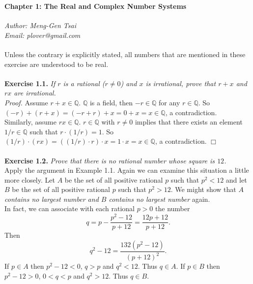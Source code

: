 \documentclass{article}
\begin{document}
\textbf{\Large Chapter 1: The Real and Complex Number Systems} \\\\



\emph{Author: Meng-Gen Tsai} \\
\emph{Email: plover@gmail.com} \\\\



Unless the contrary is explicitly stated, all numbers that are mentioned in these exercise
are understood to be real. \\\\



\textbf{Exercise 1.1.}
\emph{If $r$ is a rational ($r \neq 0$) and $x$ is irrational,
prove that $r + x$ and $rx$ are irrational.} \\

\emph{Proof.}
Assume $r + x \in \mathbb{Q}$.
$\mathbb{Q}$ is a field, then $-r \in \mathbb{Q}$ for any $r \in \mathbb{Q}$.
So $(-r) + (r + x) = (-r + r) + x = 0 + x = x \in \mathbb{Q}$, a contradiction. \\

Similarly, assume $rx \in \mathbb{Q}$. $r \in \mathbb{Q}$ with $r \neq 0$ implies that
there exists an element $1/r \in \mathbb{Q}$ such that $r \cdot (1/r) = 1$.
So $(1/r) \cdot (rx) = ((1/r) \cdot r) \cdot x = 1 \cdot x = x \in \mathbb{Q}$, a contradiction.
$\Box$ \\\\



\textbf{Exercise 1.2.}
\emph{Prove that there is no rational number whose square is $12$.} \\

Apply the argument in Example 1.1.
Again we can examine this situation a little more closely.
Let $A$ be the set of all positive rational $p$ such that $p^2 < 12$ and
let $B$ be the set of all positive rational $p$ such that $p^2 > 12$.
We might show that
\emph{$A$ contains no largest number and
$B$ contains no largest number} again. \\

In fact, we can associate with each rational $p > 0$ the number
$$q = p - \frac{p^2 - 12}{p + 12} = \frac{12p + 12}{p + 12}.$$
Then
$$q^2 - 12 = \frac{132(p^2 - 12)}{(p + 12)^2}.$$
If $p \in A$ then $p^2 - 12 < 0$, $q > p$ and $q^2 < 12$. Thus $q \in A$.
If $p \in B$ then $p^2 - 12 > 0$, $0 < q < p$ and $q^2 > 12$. Thus $q \in B$. \\
\end{document}
